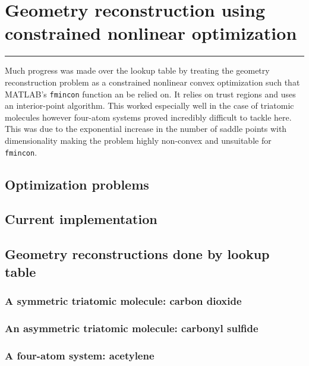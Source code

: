 \chapter{Geometry reconstruction using constrained nonlinear optimization}\label{ch:optimization}

\vspace{-1.5 em}
\begin{addmargin}[-0.5cm]{0cm}
  \minitoc
\end{addmargin}
\hrule
\vspace{1.5 em}

Much progress was made over the lookup table by treating the geometry reconstruction problem as a constrained nonlinear convex optimization such that MATLAB's \texttt{fmincon} function an be relied on. It relies on trust regions and uses an interior-point algorithm. This worked especially well in the case of triatomic molecules however four-atom systems proved incredibly difficult to tackle here. This was due to the exponential increase in the number of saddle points with dimensionality \footnotemark making the problem highly non-convex and unsuitable for \texttt{fmincon}.


\section{Optimization problems}

\section{Current implementation}

\section{Geometry reconstructions done by lookup table}
\subsection{A symmetric triatomic molecule: carbon dioxide}
\subsection{An asymmetric triatomic molecule: carbonyl sulfide}
\subsection{A four-atom system: acetylene}

